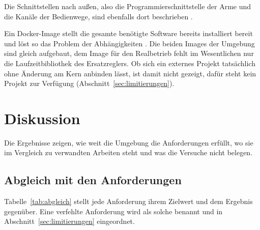 Die Schnittstellen nach außen, also die Programmierschnittstelle der Arme und die Kanäle der Bedienwege, sind ebenfalls dort beschrieben .

Ein Docker-Image stellt die gesamte benötigte Software bereits installiert bereit und löst so das Problem der Abhängigkeiten \cite{Boettiger2015}.
Die beiden Images der Umgebung sind gleich aufgebaut, dem Image für den Realbetrieb fehlt im Wesentlichen nur die Laufzeitbibliothek des Ersatzreglers.
Ob sich ein externes Projekt tatsächlich ohne Änderung am Kern anbinden lässt, ist damit nicht gezeigt, dafür steht kein Projekt zur Verfügung (Abschnitt~\ref{sec:limitierungen}).

\section{Diskussion}
\label{sec:diskussion}
Die Ergebnisse zeigen, wie weit die Umgebung die Anforderungen erfüllt, wo sie im Vergleich zu verwandten Arbeiten steht und was die Versuche nicht belegen.

\subsection{Abgleich mit den Anforderungen}
\label{sec:abgleich}
Tabelle~\ref{tab:abgleich} stellt jede Anforderung ihrem Zielwert und dem Ergebnis gegenüber.
Eine verfehlte Anforderung wird als solche benannt und in Abschnitt~\ref{sec:limitierungen} eingeordnet.


